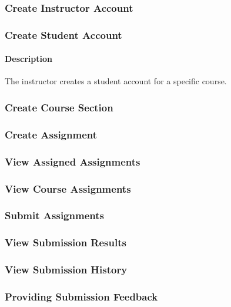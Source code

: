 \documentclass{article}
\begin{document}
\subsubsection{Create Instructor Account}

\subsubsection{Create Student Account}

\paragraph{Description} The instructor creates a student account for a specific course.


\subsubsection{Create Course Section}

\subsubsection{Create Assignment}


\subsubsection{View Assigned Assignments}

\subsubsection{View Course Assignments}


\subsubsection{Submit Assignments}


\subsubsection{View Submission Results}

\subsubsection{View Submission History}

\subsubsection{Providing Submission Feedback}
\end{document}

